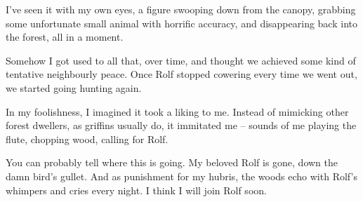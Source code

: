 \begin{multicols}{2}
\begin{exampletext}
  I've seen it with my own eyes, a figure swooping down from the canopy, grabbing some unfortunate small animal with horrific accuracy, and disappearing back into the forest, all in a moment.

  Somehow I got used to all that, over time, and thought we achieved some kind of tentative neighbourly peace.
  Once Rolf stopped cowering every time we went out, we started going hunting again.

  In my foolishness, I imagined it took a liking to me.
  Instead of mimicking other forest dwellers, as griffins usually do, it immitated me -- sounds of me playing the flute, chopping wood, calling for Rolf.

  You can probably tell where this is going.
  My beloved Rolf is gone, down the damn bird's gullet.
  And as punishment for my hubris, the woods echo with Rolf's whimpers and cries every night.
  I think I will join Rolf soon.

\end{exampletext}

\end{multicols}
